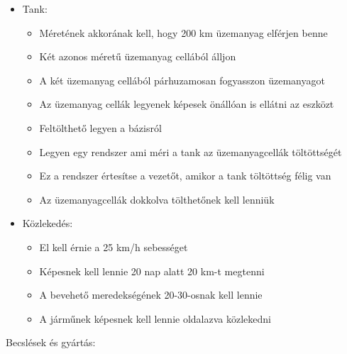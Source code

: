 \documentclass[12pt]{report}
\begin{document}
\begin{itemize}
\begin{itemize}
        \end{itemize}
    \item {} Tank:
        \begin{itemize}
            \item Méretének akkorának kell, hogy 200 km üzemanyag elférjen benne
            \item Két azonos méretű üzemanyag cellából álljon
            \item A két üzemanyag cellából párhuzamosan fogyasszon üzemanyagot
            \item Az üzemanyag cellák legyenek képesek önállóan is ellátni az eszközt
            \item Feltölthető legyen a bázisról
            \item Legyen egy rendszer ami méri a tank az üzemanyagcellák töltöttségét
            \item Ez a rendszer értesítse a vezetőt, amikor a tank töltöttség félig van
            \item Az üzemanyagcellák dokkolva tölthetőnek kell lenniük
        \end{itemize}
    \item {} Közlekedés:
        \begin{itemize}
            \item El kell érnie a  25 km/h sebességet
            \item Képesnek kell lennie 20 nap alatt 20 km-t megtenni
            \item A bevehető meredekségének 20-30-osnak kell lennie
            \item A járműnek képesnek kell lennie oldalazva közlekedni
        \end{itemize}
\end{itemize}

Becslések és gyártás:
\end{document}
